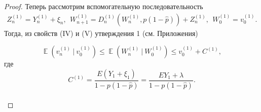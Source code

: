 \documentclass[10pt, reqno]{amsart}
\DeclareMathOperator*{\E}{\mathbb{E}}
\begin{document}
\begin{proof}
Теперь рассмотрим вспомогательную последовательность
\begin{align}
    Z_{n}^{(1)} = Y_{n}^{(1)} + \xi_{n}, \:\: W_{n+1}^{(1)} = D_{n}^{(1)}(W_{n}^{(1)}, p(1-\hat{p})) + Z_{n}^{(1)},\:\:  W_{0}^{(1)}=v_{0}^{(1)}.
    \label{auxilarry_chain_for_bounds}
\end{align}
Тогда, из свойств (IV) и (V) утверждения 1 (см. Приложения)

\begin{equation}
    \E(v_{n}^{(1)}\:|\:v_{0}^{(1)}) \leq \E(W_{n}^{(1)}\:|\:W_{0}^{(1)}) \leq v_{0}^{(1)} + C^{(1)},
    \label{v_estimation}
\end{equation}
где\\
\begin{equation*}
    C^{(1)} = \frac{E(Y_{1} + \xi_{1})}{1-p(1-\hat{p})} = \frac{EY_{1} + \lambda}{1-p(1-\hat{p})}.
\end{equation*}
\\


\end{proof}
\end{document}
